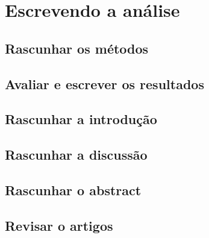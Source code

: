 \documentclass{article}
\begin{document}
\section{Escrevendo a análise}

\subsection{Rascunhar os métodos}

\subsection{Avaliar e escrever os resultados}

\subsection{Rascunhar a introdução}

\subsection{Rascunhar a discussão}

\subsection{Rascunhar o abstract}
%
\subsection{Revisar o artigos}



\end{document}
